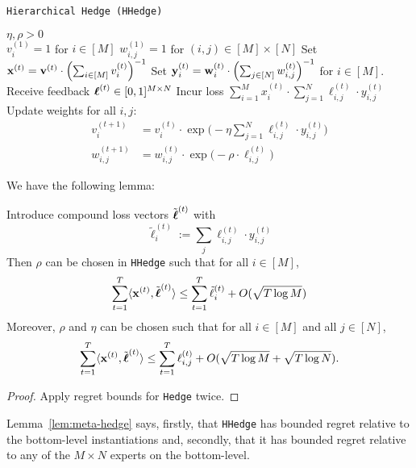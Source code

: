 \begin{algorithm}
   \caption{\texttt{Hierarchical Hedge (HHedge)}}
   \label{alg:meta-hedge}
   \begin{algorithmic}   
   	 $\eta,\rho>0$\\
   	\STATE $v^{(1)}_{i}=1$ for $i\in[M]$
   	\STATE $w^{(1)}_{i,j}=1$ for $(i,j)\in[M]\times[N]$
	   \STATE Set ${\mathbf x}^{(t)} = {\mathbf v}^{(t)}\cdot\left(\sum_{i\in[M]} v^{(t)}_{i}\right)^{-1}$
	   \STATE Set ${\mathbf y}^{(t)}_{i} = {\mathbf w}^{(t)}_{i}\cdot \left(\sum_{j\in[N]} w^{(t)}_{i,j}\right)^{-1}$ for $i\in[M]$.
		\STATE Receive feedback $\boldsymbol\ell^{(t)}\in [0,1]^{M\times N}$
		\STATE Incur loss $\sum_{i=1}^{M} x^{(t)}_{i}\cdot\sum_{j=1}^N\ell^{(t)}_{i,j}\cdot y^{(t)}_{i,j}$
		\STATE Update weights for all $i,j$:
		\begin{align}
			v^{(t+1)}_i & = v^{(t)}_{i}\cdot \exp\big(-\eta \sum_{j=1}^N\ell^{(t)}_{i,j}\cdot y^{(t)}_{i,j}\big)
			\\
			w^{(t+1)}_{i,j} & = w^{(t)}_{i,j}\cdot \exp\big(-\rho\cdot \ell^{(t)}_{i,j}\big)
		\end{align}
    	\ENDFOR
   	\end{algorithmic}
\end{algorithm}

We have the following lemma:

\begin{lem}\label{lem:meta-hedge}
	Introduce compound loss vectors $\tilde{\boldsymbol\ell}^{(t)}$ with 
	$$\tilde{\ell}^{(t)}_i := \sum_j \ell^{(t)}_{i,j}\cdot y^{(t)}_{i,j}$$
	Then $\rho$ can be chosen in \texttt{HHedge} such that for all $i\in[M]$,
	\begin{equation}
		\sum_{t=1}^T \langle {\mathbf x}^{(t)},\tilde{\boldsymbol\ell}^{(t)}\rangle 
		\leq  \sum_{t=1}^T \tilde{\ell}^{(t)}_i +
		 O(\sqrt{T \log M})
	\end{equation}
	Moreover, $\rho$ and $\eta$ can be chosen such that for all $i\in[M]$ and all $j\in[N]$,
	\begin{equation}
	   \sum_{t=1}^T \langle {\mathbf x}^{(t)},\tilde{\boldsymbol\ell}^{(t)}\rangle 
		\leq \sum_{t=1}^T\ell^{(t)}_{i,j}
		+ O(\sqrt{T \log M} + \sqrt{T \log N}).
	\end{equation}
\end{lem}

\begin{proof}
	Apply regret bounds for \texttt{Hedge} twice. %
\end{proof}

Lemma~\ref{lem:meta-hedge} says, firstly, that \texttt{HHedge} has bounded regret relative to the bottom-level instantiations and, secondly, that it has bounded regret relative to any of the $M\times N$ experts on the bottom-level.


